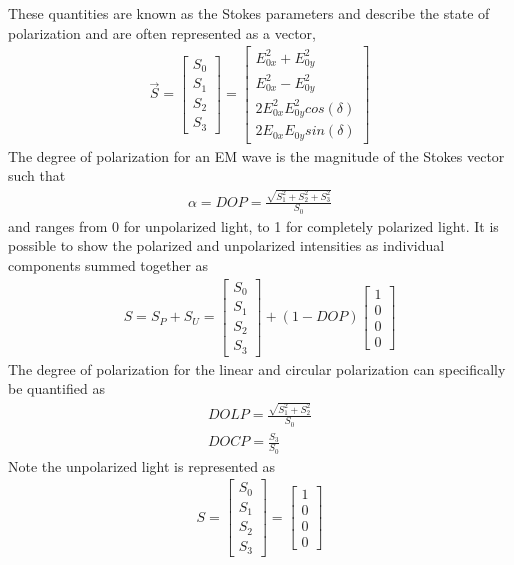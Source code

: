These quantities are known as the Stokes parameters and describe the state of polarization and are often represented as a vector,
%
\begin{align}
    \vec{S} =
    \begin{bmatrix}
        S_0 \\
        S_1 \\
        S_2 \\
        S_3
    \end{bmatrix}
    =
    \begin{bmatrix}
        E_{0x}^2+E_{0y}^2 \\
        E_{0x}^2-E_{0y}^2 \\
        2E_{0x}^2 E_{0y}^2 cos(\delta) \\
        2E_{0x} E_{0y}  sin(\delta)
    \end{bmatrix}
\end{align}
%
The degree of polarization for an EM wave is the magnitude of the Stokes vector such that
%
\begin{align}
    \alpha =DOP=  \frac{\sqrt{S_1^2+S_2^2+S_3^2 }}{S_0}
\end{align}
%
and ranges from 0 for unpolarized light, to 1 for completely polarized light.  It is possible to show the polarized and unpolarized intensities as individual components
summed together as
%
\begin{align}
    S=S_P+S_U=
    \begin{bmatrix}
        S_0 \\
        S_1 \\
        S_2 \\
        S_3
    \end{bmatrix}
    +(1-DOP)
    \begin{bmatrix}
        1 \\
        0 \\
        0 \\
        0
    \end{bmatrix}
\end{align}
%
The degree of polarization for the linear and circular polarization can specifically be quantified as
%
\begin{align}
    DOLP=  \frac{\sqrt{S_1^2+S_2^2 }}{S_0} \\
    DOCP=  \frac{S_3}{S_0}
\end{align}
%
Note the unpolarized light is represented as
%
\begin{align}
    S=
    \begin{bmatrix}
        S_0 \\
        S_1 \\
        S_2 \\
        S_3
    \end{bmatrix}
    =
    \begin{bmatrix}
        1 \\
        0 \\
        0 \\
        0
    \end{bmatrix}
\end{align}
